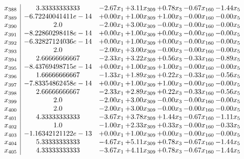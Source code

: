 \documentclass[8pt]{article}
\begin{document}
\[\begin{array}{c| c c@{\hskip 2pt} c@{\hskip 2pt} c@{\hskip 2pt} c@{\hskip 2pt} c@{\hskip 2pt} }
 x_{388}   &  3.33333333333 & -2.67 x_{1} & +  3.11 x_{309} & +  0.78 x_{3} & -0.67 x_{160} & -1.44 x_{5}\\
 x_{389}   &  -6.72240041411e-14 & +  0.00 x_{1} & +  1.00 x_{309} & +  1.00 x_{3} & -0.00 x_{160} & -0.00 x_{5}\\
 x_{390}   &  2.0 & -2.00 x_{1} & +  3.00 x_{309} & -0.00 x_{3} & -0.00 x_{160} & -0.00 x_{5}\\
 x_{391}   &  -8.22860298418e-14 & +  0.00 x_{1} & +  1.00 x_{309} & +  0.00 x_{3} & -0.00 x_{160} & -0.00 x_{5}\\
 x_{392}   &  -6.32827124036e-14 & +  0.00 x_{1} & +  1.00 x_{309} & +  0.00 x_{3} & -0.00 x_{160} & -0.00 x_{5}\\
 x_{393}   &  2.0 & -2.00 x_{1} & +  3.00 x_{309} & -0.00 x_{3} & -0.00 x_{160} & -0.00 x_{5}\\
 x_{394}   &  2.66666666667 & -2.33 x_{1} & +  3.22 x_{309} & +  0.56 x_{3} & -0.33 x_{160} & -0.89 x_{5}\\
 x_{395}   &  -8.43769498715e-14 & +  0.00 x_{1} & +  1.00 x_{309} & +  1.00 x_{3} & -0.00 x_{160} & -0.00 x_{5}\\
 x_{396}   &  1.66666666667 & -1.33 x_{1} & +  1.89 x_{309} & +  0.22 x_{3} & -0.33 x_{160} & -0.56 x_{5}\\
 x_{397}   &  -7.83354862458e-14 & +  0.00 x_{1} & +  1.00 x_{309} & +  1.00 x_{3} & -0.00 x_{160} & -0.00 x_{5}\\
 x_{398}   &  2.66666666667 & -2.33 x_{1} & +  2.89 x_{309} & +  0.22 x_{3} & -0.33 x_{160} & -0.56 x_{5}\\
 x_{399}   &  2.0 & -2.00 x_{1} & +  3.00 x_{309} & -0.00 x_{3} & -0.00 x_{160} & -0.00 x_{5}\\
 x_{400}   &  2.0 & -2.00 x_{1} & +  3.00 x_{309} & -0.00 x_{3} & -0.00 x_{160} & -0.00 x_{5}\\
 x_{401}   &  4.33333333333 & -3.67 x_{1} & +  3.78 x_{309} & +  1.44 x_{3} & -0.67 x_{160} & -1.11 x_{5}\\
 x_{402}   &  1.0 & -1.00 x_{1} & +  2.33 x_{309} & +  0.33 x_{3} & -0.00 x_{160} & -0.33 x_{5}\\
 x_{403}   &  -1.16342121122e-13 & +  0.00 x_{1} & +  1.00 x_{309} & +  0.00 x_{3} & -0.00 x_{160} & -0.00 x_{5}\\
 x_{404}   &  5.33333333333 & -4.67 x_{1} & +  5.11 x_{309} & +  0.78 x_{3} & -0.67 x_{160} & -1.44 x_{5}\\
 x_{405}   &  4.33333333333 & -3.67 x_{1} & +  4.11 x_{309} & +  0.78 x_{3} & -0.67 x_{160} & -1.44 x_{5}\\

\end{array}\]
\end{document}
